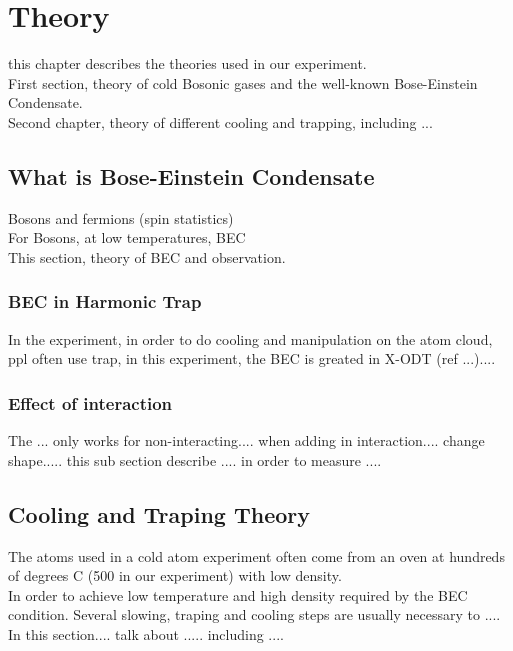 \chapter{Theory}
this chapter describes the theories used in our experiment.\\
First section, theory of cold Bosonic gases and the well-known Bose-Einstein Condensate.\\
Second chapter, theory of different cooling and trapping, including ...\\

\section{What is Bose-Einstein Condensate}\label{ch1:bec}

Bosons and fermions (spin statistics\cite{spin-statistics1,spin-statistics2})\\
For Bosons, at low temperatures, BEC\\
This section, theory of BEC and observation.

\subsection{BEC in Harmonic Trap}

In the experiment, in order to do cooling and manipulation on the atom cloud, ppl often use trap, in this experiment, the BEC is greated in X-ODT (ref ...)....

\subsection{Effect of interaction}

The ... only works for non-interacting.... when adding in interaction.... change shape..... this sub section describe .... in order to measure ....

\section{Cooling and Traping Theory}
The atoms used in a cold atom experiment often come from an oven at hundreds of degrees C (500 in our experiment) with low density.\\
In order to achieve low temperature and high density required by the BEC condition. Several slowing, traping and cooling steps are usually necessary to ....\\
In this section.... talk about ..... including ....\\

